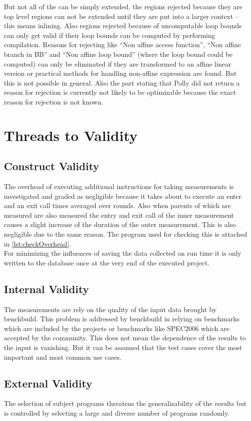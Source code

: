 But not all of the \scops can be simply extended.
\Eg the regions rejected because they are top level regions can not be extended until they are put into a larger context -- this means inlining.
Also regions rejected because of uncomputable loop bounds can only get valid if their loop bounds can be computed \eg by performing \jit compilation.
Reasons for rejecting like \enquote{Non affine access function}, \enquote{Non affine branch in BB} and \enquote{Non affine loop bound} (where the loop bound could be computed) can only be eliminated if they are transformed to an affine linear version or practical methods for handling non-affine expression are found.
But this is not possible in general. 
Also the part stating that Polly did not return a reason for rejection is currently not likely to be optimizable because the exact reason for rejection is not known.

\section{Threads to Validity}
\subsection{Construct Validity}
The overhead of executing additional instructions for taking measurements is investigated and graded as negligible because it takes about \measurementOverhead to execute an enter and an exit call \overheadIterations times averaged over \overheadRounds rounds.
Also when parents of \scops which are measured are also measured the entry and exit call of the inner measurement causes a slight increase of the duration of the outer measurement.
This is also negligible due to the same reason.
The program used for checking this is attached in \autoref{lst:checkOverhead}.\\
For minimizing the influences of saving the data collected on run time it is only written to the database once at the very end of the executed project.\\
\subsection{Internal Validity}
The measurements are rely on the quality of the input data brought by benchbuild.
This problem is addressed by benchbuild in relying on benchmarks which are included by the projects or benchmarks like SPEC2006 which are accepted by the community.
This does not mean the dependence of the results to the input is vanishing.
But it can be assumed that the test cases cover the most important and most common use cases.
\subsection{External Validity}
The selection of subject programs threatens the generalizability of the results but is controlled by selecting a large and diverse number of programs randomly.

